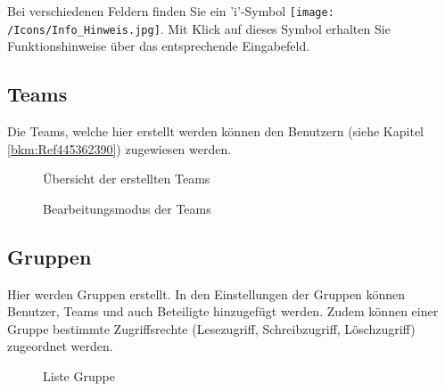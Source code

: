 Bei verschiedenen Feldern finden Sie ein 'i'-Symbol \texttt{[image: /Icons/Info\_Hinweis.jpg]}. Mit Klick auf dieses Symbol erhalten Sie Funktionshinweise über das entsprechende Eingabefeld.

\subsection{Teams}

Die Teams, welche hier erstellt werden können den Benutzern (siehe Kapitel \ref{bkm:Ref445362390}) zugewiesen werden.

\begin{figure}[H]
\caption{Übersicht der erstellten Teams}
\end{figure}

\begin{figure}[H]
\caption{Bearbeitungsmodus der Teams}
\end{figure}

\clearpage
\subsection{Gruppen}

Hier werden Gruppen erstellt. In den Einstellungen der Gruppen können Benutzer, Teams und auch Beteiligte hinzugefügt werden. Zudem können einer Gruppe bestimmte Zugriffsrechte (Lesezugriff, Schreibzugriff, Löschzugriff) zugeordnet werden.

\begin{figure}[H]
\caption{Liste Gruppe}
\end{figure}

